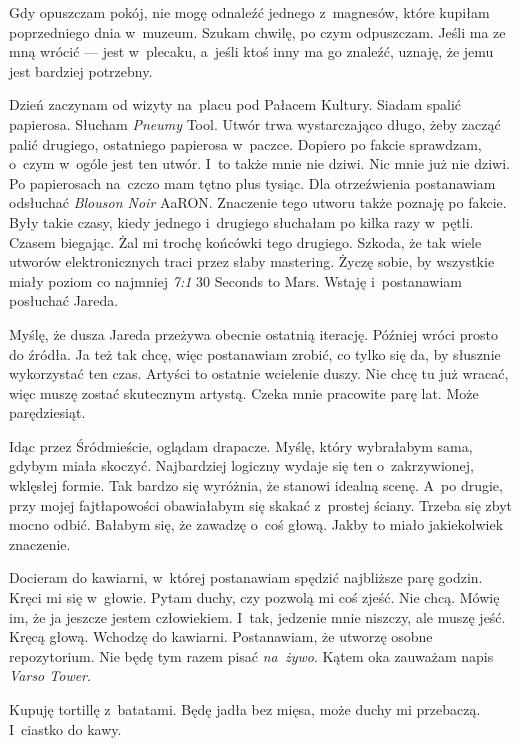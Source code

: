 \documentclass[9pt, a5paper]{memoir}
\begin{document}
Gdy opuszczam pokój, nie mogę odnaleźć jednego z~magnesów, które kupiłam poprzedniego dnia w~muzeum. Szukam chwilę, po czym odpuszczam. Jeśli ma ze mną wrócić --- jest w~plecaku, a~jeśli ktoś inny ma go znaleźć, uznaję, że jemu jest bardziej potrzebny.

Dzień zaczynam od wizyty na~placu pod Pałacem Kultury. Siadam spalić papierosa. Słucham \textit{Pneumy} Tool. Utwór trwa wystarczająco długo, żeby zacząć palić drugiego, ostatniego papierosa w~paczce. Dopiero po fakcie sprawdzam, o~czym w~ogóle jest ten utwór. I~to także mnie nie dziwi. Nic mnie już nie dziwi. Po papierosach na~czczo mam tętno plus tysiąc. Dla otrzeźwienia postanawiam odsłuchać \textit{Blouson Noir} AaRON. Znaczenie tego utworu także poznaję po fakcie. Były takie czasy, kiedy jednego i~drugiego słuchałam po kilka razy w~pętli. Czasem biegając. Żal mi trochę końcówki tego drugiego. Szkoda, że tak wiele utworów elektronicznych traci przez słaby mastering. Życzę sobie, by wszystkie miały poziom co najmniej \textit{7:1} 30 Seconds to Mars. Wstaję i~postanawiam posłuchać Jareda.

Myślę, że dusza Jareda przeżywa obecnie ostatnią iterację. Później wróci prosto do źródła. Ja też tak chcę, więc postanawiam zrobić, co tylko się da, by słusznie wykorzystać ten czas. Artyści to ostatnie wcielenie duszy. Nie chcę tu już wracać, więc muszę zostać skutecznym artystą. Czeka mnie pracowite parę lat. Może parędziesiąt.

Idąc przez Śródmieście, oglądam drapacze. Myślę, który wybrałabym sama, gdybym miała skoczyć. Najbardziej logiczny wydaje się ten o~zakrzywionej, wklęsłej formie. Tak bardzo się wyróżnia, że stanowi idealną scenę. A~po drugie, przy mojej fajtłapowości obawiałabym się skakać z~prostej ściany. Trzeba się zbyt mocno odbić. Bałabym się, że zawadzę o~coś głową. Jakby to miało jakiekolwiek znaczenie.

Docieram do kawiarni, w~której postanawiam spędzić najbliższe parę godzin. Kręci mi się w~głowie. Pytam duchy, czy pozwolą mi coś zjeść. Nie chcą. Mówię im, że ja jeszcze jestem człowiekiem. I~tak, jedzenie mnie niszczy, ale muszę jeść. Kręcą głową. Wchodzę do kawiarni. Postanawiam, że utworzę osobne repozytorium. Nie będę tym razem pisać \textit{na~żywo}. Kątem oka zauważam napis \textit{Varso Tower}.

Kupuję tortillę z~batatami. Będę jadła bez mięsa, może duchy mi przebaczą. I~ciastko do kawy.

\newpage
\end{document}

